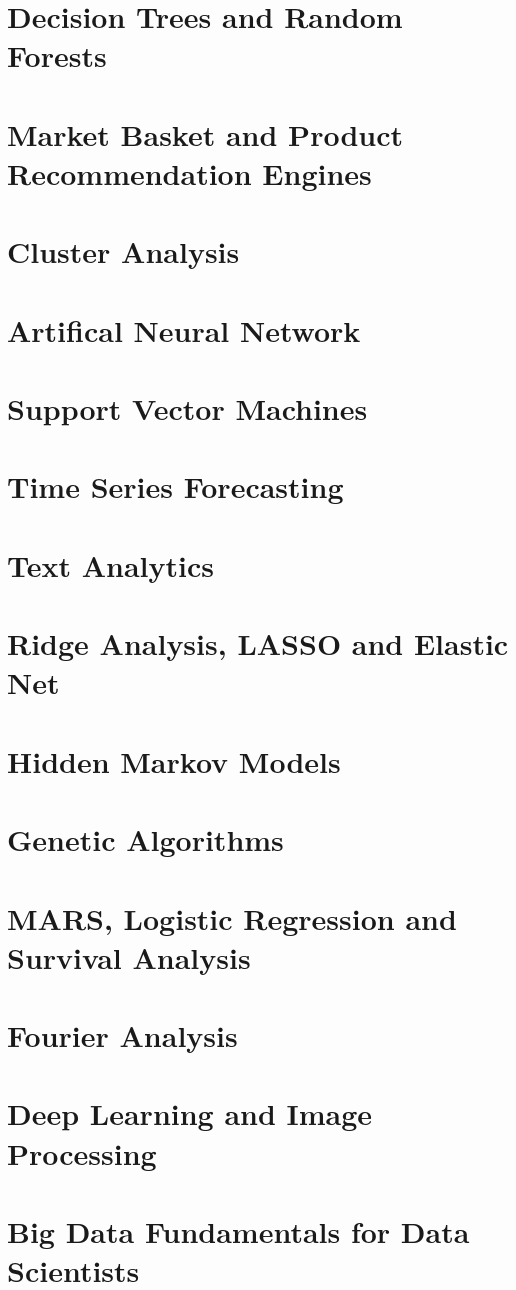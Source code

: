 \documentclass{book}
\begin{document}
\chapter{Decision Trees and Random Forests}
\chapter{Market Basket and Product Recommendation Engines}
\chapter{Cluster Analysis}
\chapter{Artifical Neural Network}
\chapter{Support Vector Machines}
\chapter{Time Series Forecasting}
\chapter{Text Analytics}
\chapter{Ridge Analysis, LASSO and Elastic Net}
\chapter{Hidden Markov Models}
\chapter{Genetic Algorithms}
\chapter{MARS, Logistic Regression and Survival Analysis}
\chapter{Fourier Analysis}
\chapter{Deep Learning and Image Processing}
\chapter{Big Data Fundamentals for Data Scientists}
\end{document}
